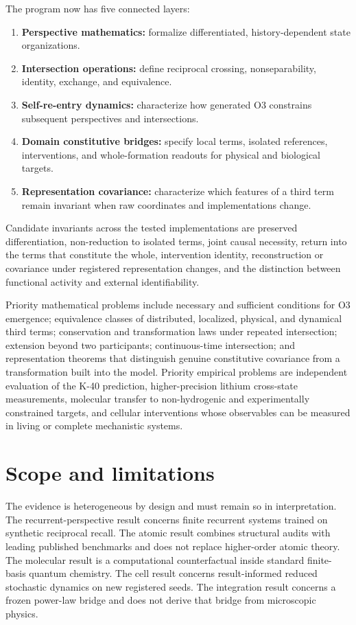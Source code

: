 \documentclass[11pt,a4paper]{article}
\begin{document}
The program now has five connected layers:
\begin{enumerate}
  \item \textbf{Perspective mathematics:} formalize differentiated, history-dependent state organizations.
  \item \textbf{Intersection operations:} define reciprocal crossing, nonseparability, identity, exchange, and equivalence.
  \item \textbf{Self-re-entry dynamics:} characterize how generated O3 constrains subsequent perspectives and intersections.
  \item \textbf{Domain constitutive bridges:} specify local terms, isolated references, interventions, and whole-formation readouts for physical and biological targets.
  \item \textbf{Representation covariance:} characterize which features of a third term remain invariant when raw coordinates and implementations change.
\end{enumerate}

Candidate invariants across the tested implementations are preserved differentiation, non-reduction to isolated terms, joint causal necessity, return into the terms that constitute the whole, intervention identity, reconstruction or covariance under registered representation changes, and the distinction between functional activity and external identifiability.

Priority mathematical problems include necessary and sufficient conditions for O3 emergence; equivalence classes of distributed, localized, physical, and dynamical third terms; conservation and transformation laws under repeated intersection; extension beyond two participants; continuous-time intersection; and representation theorems that distinguish genuine constitutive covariance from a transformation built into the model. Priority empirical problems are independent evaluation of the K-40 prediction, higher-precision lithium cross-state measurements, molecular transfer to non-hydrogenic and experimentally constrained targets, and cellular interventions whose observables can be measured in living or complete mechanistic systems.

\section{Scope and limitations}

The evidence is heterogeneous by design and must remain so in interpretation. The recurrent-perspective result concerns finite recurrent systems trained on synthetic reciprocal recall. The atomic result combines structural audits with leading published benchmarks and does not replace higher-order atomic theory. The molecular result is a computational counterfactual inside standard finite-basis quantum chemistry. The cell result concerns result-informed reduced stochastic dynamics on new registered seeds. The integration result concerns a frozen power-law bridge and does not derive that bridge from microscopic physics.
\end{document}
